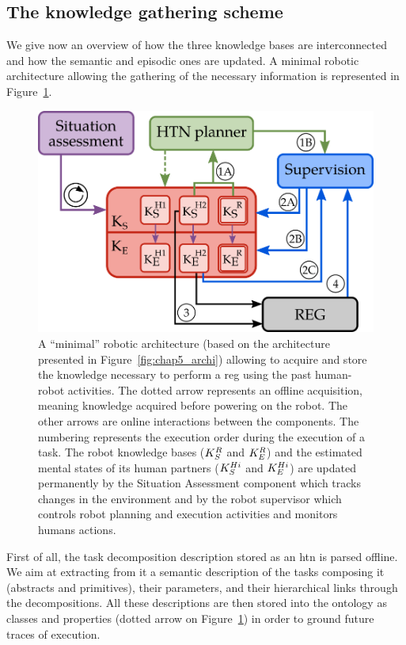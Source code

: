 \subsection{The knowledge gathering scheme}

We give now an overview of how the three knowledge bases are interconnected and how the semantic and episodic ones are updated. A minimal robotic architecture allowing the gathering of the necessary information is represented in Figure~\ref{fig:chap6_architecture}.

\newpage

\begin{figure}[ht!]
\centering
\includegraphics[scale=0.37]{figures/chapter6/architecture.png}
\caption{\label{fig:chap6_architecture} A ``minimal'' robotic architecture (based on the architecture presented in Figure~\ref{fig:chap5_archi}) allowing to acquire and store the knowledge necessary to perform a \acrshort{reg} using the past human-robot activities. The dotted arrow represents an offline acquisition, meaning knowledge acquired before powering on the robot. The other arrows are online interactions between the components. The numbering represents the execution order during the execution of a task.
The robot knowledge bases ($K_S^{R}$ and $K_E^{R}$) and the estimated mental states of its human partners ($K_S^{Hi}$ and $K_E^{Hi}$) are updated permanently by the Situation Assessment component which tracks changes in the environment and by the robot supervisor which controls robot planning and execution activities and monitors humans actions.}
\end{figure}

First of all, the task decomposition description stored as an \acrshort{htn} is parsed offline. We aim at extracting from it a semantic description of the tasks composing it (abstracts and primitives), their parameters, and their hierarchical links through the decompositions. All these descriptions are then stored into the ontology as classes and properties (dotted arrow on Figure~\ref{fig:chap6_architecture}) in order to ground future traces of execution.

